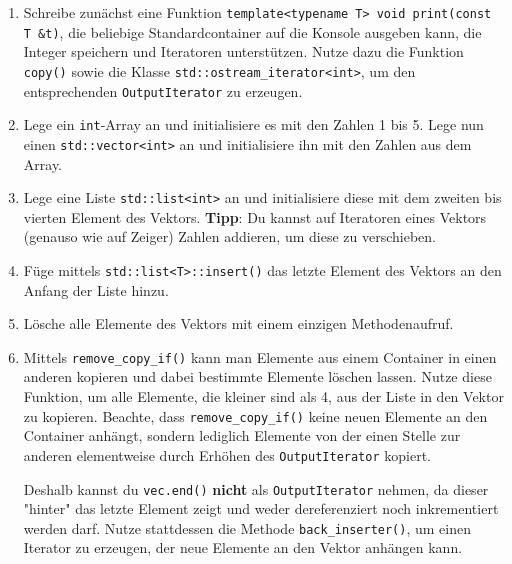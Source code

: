\begin{enumerate}
\item 
Schreibe zunächst eine Funktion \texttt{template<typename T> void print(const T \&t)}, die beliebige Standardcontainer auf die Konsole ausgeben kann, die Integer speichern und Iteratoren unterstützen.
Nutze dazu die Funktion \texttt{copy()} sowie die Klasse \texttt{std::ostream\_iterator<int>}, um den entsprechenden \texttt{OutputIterator} zu erzeugen.

\item
Lege ein \texttt{int}-Array an und initialisiere es mit den Zahlen 1 bis 5.
Lege nun einen \texttt{std::vector<int>} an und initialisiere ihn mit den Zahlen aus dem Array.

\item
Lege eine Liste \texttt{std::list<int>} an und initialisiere diese mit dem zweiten bis vierten Element des Vektors.
\textbf{Tipp}: Du kannst auf Iteratoren eines Vektors (genauso wie auf Zeiger) Zahlen addieren, um diese zu verschieben.

\item
Füge mittels \texttt{std::list<T>::insert()} das letzte Element des Vektors an den Anfang der Liste hinzu.

\item
Lösche alle Elemente des Vektors mit einem einzigen Methodenaufruf.

\item
Mittels \texttt{remove\_copy\_if()} kann man Elemente aus einem Container in einen anderen kopieren und dabei bestimmte Elemente löschen lassen.
Nutze diese Funktion, um alle Elemente, die kleiner sind als 4, aus der Liste in den Vektor zu kopieren. Beachte, dass \texttt{remove\_copy\_if()} keine neuen Elemente an den Container anhängt, sondern lediglich Elemente von der einen Stelle zur anderen elementweise durch Erhöhen des \texttt{OutputIterator} kopiert.

Deshalb kannst du \texttt{vec.end()} \textbf{nicht} als \texttt{OutputIterator} nehmen, da dieser "{}hinter"{} das letzte Element zeigt und weder dereferenziert noch inkrementiert werden darf. Nutze stattdessen die Methode \texttt{back\_inserter()}, um einen Iterator zu erzeugen, der neue Elemente an den Vektor anhängen kann.
\end{enumerate}
